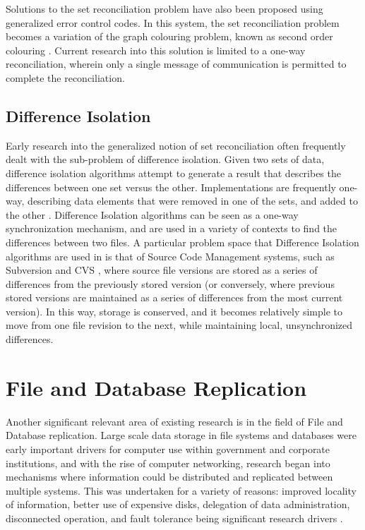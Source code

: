 Solutions to the set reconciliation problem have also been proposed using generalized error control codes.  In this system, the set reconciliation problem becomes a variation of the graph colouring problem, known as second order colouring \cite{RefWorks:15}.  Current research into this solution is limited to a one-way reconciliation, wherein only a single message of communication is permitted to complete the reconciliation.

\subsection{Difference Isolation}\label{difference_isolation}

Early research into the generalized notion of set reconciliation often frequently dealt with the sub-problem of difference isolation.  Given two sets of data, difference isolation algorithms attempt to generate a result that describes the differences between one set versus the other.  Implementations are frequently one-way, describing data elements that were removed in one of the sets, and added to the other \cite{359467, diff1}.  Difference Isolation algorithms can be seen as a one-way synchronization mechanism, and are used in a variety of contexts to find the differences between two files.  A particular problem space that Difference Isolation algorithms are used in is that of Source Code Management systems, such as Subversion and CVS  \cite{RefWorks:8, wiki:CVS}, where source file versions are stored as a series of differences from the previously stored version (or conversely, where previous stored versions are maintained as a series of differences from the most current version).  In this way, storage is conserved, and it becomes relatively simple to move from one file revision to the next, while maintaining local, unsynchronized differences.

\section {File and Database Replication}

Another significant relevant area of existing research is in the field of File and Database replication.  Large scale data storage in file systems and databases were early important drivers for computer use within government and corporate institutions, and with the rise of computer networking, research began into mechanisms where information could be distributed and replicated between multiple systems.  This was undertaken for a variety of reasons: improved locality of information, better use of expensive disks, delegation of data administration, disconnected operation, and fault tolerance being significant research drivers \cite{RefWorks:16}.

